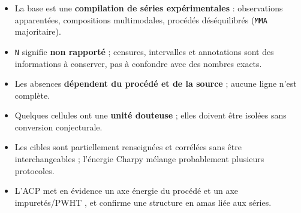 \begin{aretenir}
\begin{itemize}[leftmargin=1.2em]
  \item La base est une \textbf{compilation de séries expérimentales} : observations apparentées, compositions multimodales, procédés déséquilibrés (\texttt{MMA} majoritaire).
  \item \texttt{N} signifie \textbf{non rapporté} ; censures, intervalles et annotations sont des informations à conserver, pas à confondre avec des nombres exacts.
  \item Les absences \textbf{dépendent du procédé et de la source} ; aucune ligne n'est complète.
  \item Quelques cellules ont une \textbf{unité douteuse} ; elles doivent être isolées sans conversion conjecturale.
  \item Les cibles sont partiellement renseignées et corrélées sans être interchangeables ; l'énergie Charpy mélange probablement plusieurs protocoles.
  \item L'ACP met en évidence un axe \og énergie du procédé \fg{} et un axe \og impuretés/PWHT \fg{}, et confirme une structure en amas liée aux séries.
\end{itemize}
\end{aretenir}

